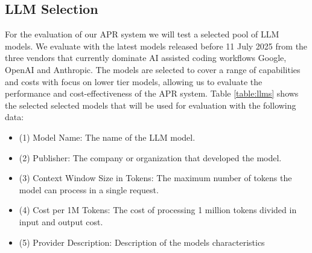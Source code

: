 \subsection{LLM Selection} \label{subsection:llm-selection}

For the evaluation of our APR system we will test a selected pool of LLM models. We evaluate with the latest models released before 11 July 2025 from the three vendors that currently dominate AI assisted coding workflows Google, OpenAI and Anthropic. The models are selected to cover a range of capabilities and costs with focus on lower tier models, allowing us to evaluate the performance and cost-effectiveness of the APR system. Table \ref{table:llms} shows the selected selected models that will be used for evaluation with the following data:

\begin{itemize}
    \item (1) Model Name: The name of the LLM model.
    \item (2) Publisher: The company or organization that developed the model.
    \item (3) Context Window Size in Tokens: The maximum number of tokens the model can process in a single request.
    \item (4) Cost per 1M Tokens: The cost of processing 1 million tokens divided in input and output cost.
    \item (5) Provider Description: Description of the models characteristics
\end{itemize}

